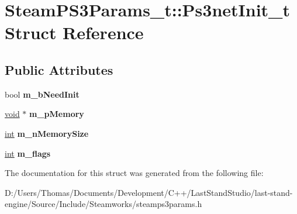 \hypertarget{structSteamPS3Params__t_1_1Ps3netInit__t}{}\section{Steam\+P\+S3\+Params\+\_\+t\+:\+:Ps3net\+Init\+\_\+t Struct Reference}
\label{structSteamPS3Params__t_1_1Ps3netInit__t}
\subsection*{Public Attributes}
\begin{DoxyCompactItemize}
\item 
\hypertarget{structSteamPS3Params__t_1_1Ps3netInit__t_a620ae03b019a05073df77a31b6880f99}{}bool {\bfseries m\+\_\+b\+Need\+Init}\label{structSteamPS3Params__t_1_1Ps3netInit__t_a620ae03b019a05073df77a31b6880f99}

\item 
\hypertarget{structSteamPS3Params__t_1_1Ps3netInit__t_a4ecb9469fe35145bbf15cb1564fa6c39}{}\hyperlink{SDL__audio_8h_a52835ae37c4bb905b903cbaf5d04b05f}{void} $\ast$ {\bfseries m\+\_\+p\+Memory}\label{structSteamPS3Params__t_1_1Ps3netInit__t_a4ecb9469fe35145bbf15cb1564fa6c39}

\item 
\hypertarget{structSteamPS3Params__t_1_1Ps3netInit__t_abaa42b3ce7c5ea3721945f422d3bf1a0}{}\hyperlink{SDL__thread_8h_a6a64f9be4433e4de6e2f2f548cf3c08e}{int} {\bfseries m\+\_\+n\+Memory\+Size}\label{structSteamPS3Params__t_1_1Ps3netInit__t_abaa42b3ce7c5ea3721945f422d3bf1a0}

\item 
\hypertarget{structSteamPS3Params__t_1_1Ps3netInit__t_a2376476353ebf7169807cf104a4fa01a}{}\hyperlink{SDL__thread_8h_a6a64f9be4433e4de6e2f2f548cf3c08e}{int} {\bfseries m\+\_\+flags}\label{structSteamPS3Params__t_1_1Ps3netInit__t_a2376476353ebf7169807cf104a4fa01a}

\end{DoxyCompactItemize}


The documentation for this struct was generated from the following file\+:\begin{DoxyCompactItemize}
\item 
D\+:/\+Users/\+Thomas/\+Documents/\+Development/\+C++/\+Last\+Stand\+Studio/last-\/stand-\/engine/\+Source/\+Include/\+Steamworks/steamps3params.\+h\end{DoxyCompactItemize}
